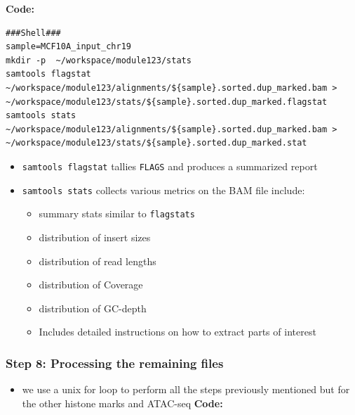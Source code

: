 \documentclass[
]{book}
\providecommand{\tightlist}{%
  \setlength{\itemsep}{0pt}\setlength{\parskip}{0pt}}
\begin{document}
\textbf{Code:}

\begin{verbatim}
###Shell###
sample=MCF10A_input_chr19
mkdir -p  ~/workspace/module123/stats
samtools flagstat ~/workspace/module123/alignments/${sample}.sorted.dup_marked.bam > ~/workspace/module123/stats/${sample}.sorted.dup_marked.flagstat
samtools stats ~/workspace/module123/alignments/${sample}.sorted.dup_marked.bam > ~/workspace/module123/stats/${sample}.sorted.dup_marked.stat
\end{verbatim}

\begin{itemize}
\tightlist
\item
  \texttt{samtools\ flagstat} tallies \texttt{FLAGS} and produces a summarized report
\item
  \texttt{samtools\ stats} collects various metrics on the BAM file include:

  \begin{itemize}
  \tightlist
  \item
    summary stats similar to \texttt{flagstats}
  \item
    distribution of insert sizes
  \item
    distribution of read lengths
  \item
    distribution of Coverage
  \item
    distribution of GC-depth
  \item
    Includes detailed instructions on how to extract parts of interest
  \end{itemize}
\end{itemize}

\subsubsection{Step 8: Processing the remaining files}\label{step-8-processing-the-remaining-files}

\begin{itemize}
\tightlist
\item
  we use a unix for loop to perform all the steps previously mentioned but for the other histone marks and ATAC-seq
  \textbf{Code:}
\end{itemize}
\end{document}
